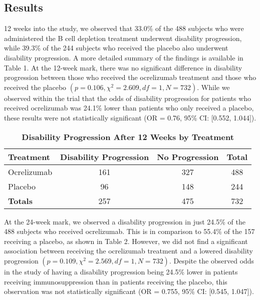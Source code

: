 \documentclass{article}
\begin{document}
	\subsection*{Results}
	12 weeks into the study, we observed that 33.0\% of the 488 subjects who were administered the B cell depletion treatment underwent disability progression, while 39.3\% of the 244 subjects who received the placebo also underwent disability progression. A more detailed summary of the findings is available in Table 1. At the 12-week mark, there was no significant difference in disability progression between those who received the ocrelizumab treatment and those who received the placebo $(p = 0.106, \chi^2 = 2.609, df = 1, N = 732)$. While we observed within the trial that the odds of disability progression for patients who received ocrelizumab was 24.1\% lower than patients who only received a placebo, these results were not statistically significant (OR = 0.76, 95\% CI: [0.552, 1.044]).

	\begin{table}[h]
		\centering
		\footnotesize
		\caption{\textbf{Disability Progression After 12 Weeks by Treatment}}
		\renewcommand{\arraystretch}{1.2}
		\begin{tabular}{lcc|c}
			\toprule
			\textbf{Treatment} & \textbf{Disability Progression} & \textbf{No Progression} & \textbf{Total} \\
			\midrule
			Ocrelizumab & 161 & 327 & 488 \\
			Placebo & 96 & 148 & 244 \\
			\midrule
			\textbf{Totals} & 257 & 475 & 732 \\
			\bottomrule
		\end{tabular}
	\end{table}

	At the 24-week mark, we observed a disability progression in just 24.5\% of the 488 subjects who received ocrelizumab. This is in comparison to 55.4\% of the 157 receiving a placebo, as shown in Table 2. However, we did not find a significant association between receiving the ocrelizumab treatment and a lowered disability progression $(p = 0.109, \chi^2 = 2.569, df = 1, N = 732)$. Despite the observed odds in the study of having a disability progression being 24.5\% lower in patients receiving immunosuppression than in patients receiving the placebo, this observation was not statistically significant (OR = 0.755, 95\% CI: [0.545, 1.047]).

	\newpage
\end{document}
